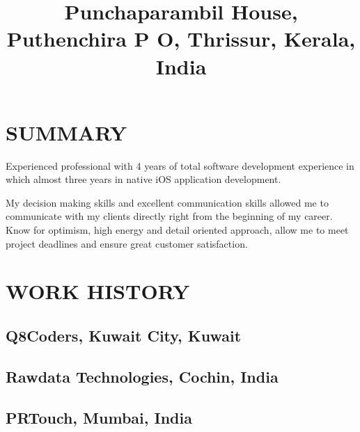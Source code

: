 \documentclass[12pt,a4paper]{moderncv}
\title{\footnotesize Punchaparambil House, Puthenchira P O, Thrissur, Kerala, India}
\begin{document}
\maketitle


\section{SUMMARY}

Experienced professional with 4 years of total software development experience in which almost three years in native iOS application development.

My decision making skills and excellent communication skills allowed me to communicate with my clients directly right from the beginning of my career. Know for optimism, high energy and detail oriented approach, allow me to meet project deadlines and ensure great customer satisfaction.


\section{WORK HISTORY}
\subsection{Q8Coders, Kuwait City, Kuwait}

\subsection{Rawdata Technologies, Cochin, India}

\subsection{PRTouch, Mumbai, India}
\end{document}
